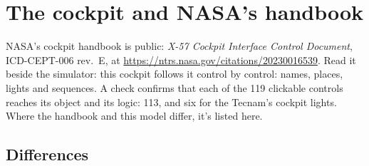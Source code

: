 \documentclass[11pt,a4paper,oneside]{book}
\begin{document}
\appendix
\chapter{The cockpit and NASA's handbook}\label{app:icd}
NASA's cockpit handbook is public: \emph{X-57 Cockpit Interface Control Document}, ICD-CEPT-006 rev.~E, at \url{https://ntrs.nasa.gov/citations/20230016539}. Read it beside the simulator: this cockpit follows it control by control: names, places, lights and sequences. A check confirms that each of the 119 clickable controls reaches its object and its logic: 113, and six for the Tecnam's cockpit lights. Where the handbook and this model differ, it's listed here.

\section{Differences}
\end{document}
